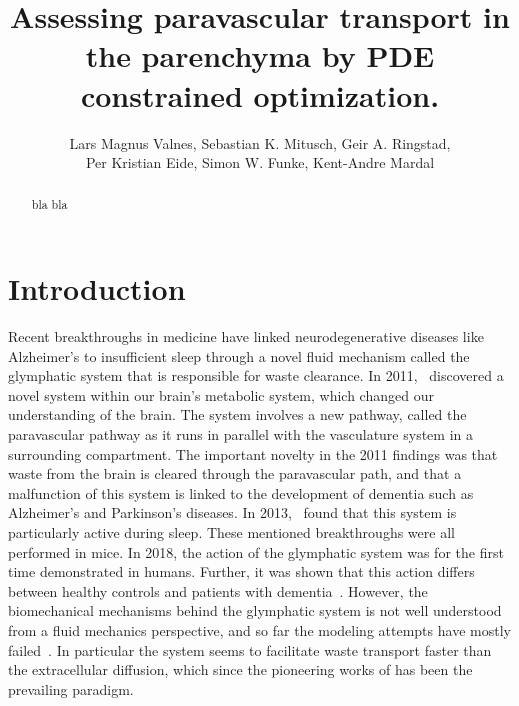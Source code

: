 \documentclass[11pt,a4paper]{article}
\title{Assessing paravascular transport in the parenchyma by PDE constrained optimization.}
\author{Lars Magnus Valnes, Sebastian K. Mitusch, Geir A. Ringstad, \\ 
Per Kristian Eide, Simon W. Funke, Kent-Andre Mardal }
\begin{document}
\maketitle

\begin{abstract}
bla bla 
\end{abstract}
\section{Introduction}
Recent breakthroughs in medicine have linked neurodegenerative diseases like Alzheimer's to insufficient sleep through a novel fluid mechanism called the glymphatic system 
that is responsible for waste clearance. 
In 2011,~\citet{iliff2012paravascular} discovered a novel system within our brain's metabolic system, which changed our understanding of the brain. 
The system involves a new pathway, called the paravascular pathway as it runs in parallel with the vasculature system in a surrounding compartment.
The important novelty in the 2011 findings was that waste from the brain is cleared through the paravascular path, and that a malfunction of this system 
is linked to the development of dementia such as Alzheimer's and Parkinson's diseases. In 2013,~\citet{xie2013sleep} found
that this system is particularly active during sleep.
These mentioned breakthroughs were all performed in mice. In 2018, the action of the glymphatic system was for the first time demonstrated in humans. Further, it was shown that this action differs
between healthy controls and patients with dementia~\cite{ringstad2018brain}.
However, the biomechanical mechanisms behind the glymphatic system is not well understood from a fluid mechanics perspective,
and so far the modeling attempts have mostly failed~\cite{asgari2016glymphatic, holter2017interstitial, smith2017glymphatic}. 
In particular the system seems to facilitate waste transport faster than  
the extracellular diffusion, which since the pioneering works of \citet{sykova2008diffusion} 
has been the prevailing paradigm.
\end{document}
